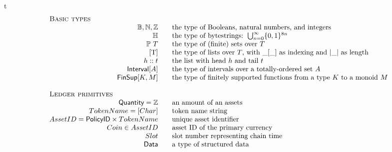 \begin{ruledfigure}{t}
  \begin{displaymath}
    \begin{array}{rll}
      \multicolumn{3}{l}{\textsc{Basic types}}\\
     \B, \N, \Z && \mbox{the type of Booleans, natural numbers, and integers}\\
      \H{} && \mbox{the type of bytestrings: } \bigcup_{n=0}^{\infty}\{0,1\}^{8n}\\
      \powerset{T} && \mbox{the type of (finite) sets over $T$}\\
      $[T]$ && \mbox{the type of lists over $T$, with $\_[\_]$ as indexing and $|\_|$ as length}\\
      h::t && \mbox{the list with head $h$ and tail $t$}\\
      \Interval{A} && \mbox{the type of intervals over a totally-ordered set $A$}\\
      \FinSup{K}{M} && \mbox{the type of finitely supported functions from a type $K$ to a monoid $M$}\\
      \\
      \multicolumn{3}{l}{\textsc{Ledger primitives}}\\
      \Quantity = \Z && \mbox{an amount of an assets}\\
      \TokenName = [\type{Char}] && \mbox{token name string}\\
      \AssetID = \Policy \times \TokenName && \mbox{unique asset identifier}\\
      \Coin \in \AssetID && \mbox{asset ID of the primary currency }\\
      \Tick && \mbox{slot number representing chain time}\\
      \Data && \mbox{a type of structured data}\\

\end{array}
\end{displaymath}
\end{ruledfigure}
